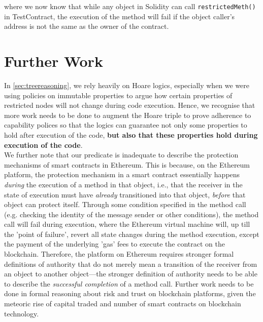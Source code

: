 \documentclass[a4paper,11pt,twoside]{article}
\begin{document}
{where we now know that while any object in Solidity can call \texttt{restrictedMeth()} in TestContract, the execution of the method will fail if the object caller's address is not the same as the owner of the contract.
\section{Further Work}
In \cref{sec:treereasoning}, we rely heavily on Hoare logics, especially when we were using policies on immutable properties to argue how certain properties of restricted nodes will not change  during code execution. Hence, we recognise that more work needs to be done to augment the Hoare triple to prove adherence to capability polices so that the logics can guarantee not only some properties to hold after execution of the code, \textbf{but also that these properties hold during execution of the code}.\\

We further note that our  predicate is inadequate to describe the protection mechanisms of smart contracts in Ethereum. This is because, on the Ethereum platform, the protection mechanism in a smart contract essentially happens \textit{during} the execution of a method in that object, i.e., that the receiver in the state of execution must have \textit{already} transitioned into that object, \textit{before} that object can protect itself. Through some condition specified in the method call (e.g. checking the identity of the message sender or other conditions), the method call will fail during execution, where the Ethereum virtual machine will, up till the 'point of failure', revert all state changes during the method execution, except the payment of the underlying 'gas' fees to execute the contract on the blockchain. Therefore, the platform on Ethereum requires stronger formal definitions of authority that do not merely mean a transition of the receiver from an object to another object---the stronger definition of authority needs to be able to describe the \textit{successful completion} of a method call. Further work needs to be done in formal reasoning about risk and trust on blockchain platforms, given the meteoric rise of capital traded and number of smart contracts on blockchain technology.

}
\end{document}
